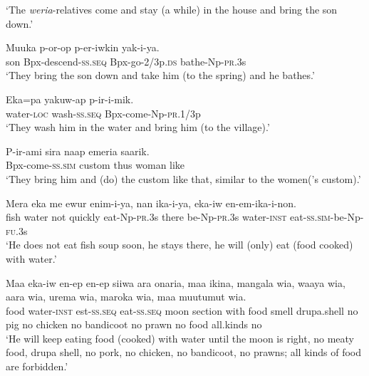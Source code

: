 \glt ‘The \textit{weria}{}-relatives come and stay (a while) in the house and bring the son down.’ \\
\z


\ea
\gll  Muuka  p-or-op  p-er-iwkin  yak-i-ya. \\
son  Bpx-descend-\textsc{ss.seq}  Bpx-go-2/3p.\textsc{ds}  bathe-Np-\textsc{pr}.3s \\
\glt ‘They bring the son down and take him (to the spring) and he bathes.’ \\
\z


\ea
\gll  Eka=pa  yakuw-ap  p-ir-i-mik. \\
water-\textsc{loc}  wash-\textsc{ss.seq}  Bpx-come-Np-\textsc{pr}.1/3p \\
\glt ‘They wash him in the water and bring him (to the village).’ \\
\z


\ea
\gll  P-ir-ami  sira  naap  emeria  saarik. \\
Bpx-come-\textsc{ss}.\textsc{sim}  custom  thus  woman  like \\
\glt ‘They bring him and (do) the custom like that, similar to the women(’s custom).’ \\
\z


\ea
\gll  Mera  eka  me  ewur  enim-i-ya,  nan  ika-i-ya,  eka-iw           en-em-ika-i-non. \\
fish  water  not  quickly  eat-Np-\textsc{pr}.3s  there  be-Np-\textsc{pr}.3s  water-\textsc{inst} eat-\textsc{ss}.\textsc{sim}-be-Np-\textsc{fu}.3s \\


\glt ‘He does not eat fish soup soon, he stays there, he will (only) eat (food cooked) with water.’ \\
\z


\ea
\gll  Maa  eka-iw  en-ep  en-ep  siiwa  ara  onaria,  maa  ikina,          mangala  wia,  waaya  wia,  aara  wia,  urema  wia,  maroka  wia, maa  muutumut  wia. \\
food  water-\textsc{inst}  est-\textsc{ss.seq}  eat-\textsc{ss.seq}  moon  section  with  food  smell drupa.shell  no  pig  no  chicken  no  bandicoot  no  prawn  no   food  all.kinds  no \\




\glt ‘He will keep eating food (cooked) with water until the moon is right, no meaty food, drupa shell, no pork, no chicken, no bandicoot, no prawns; all kinds of food are forbidden.’ \\
\z


